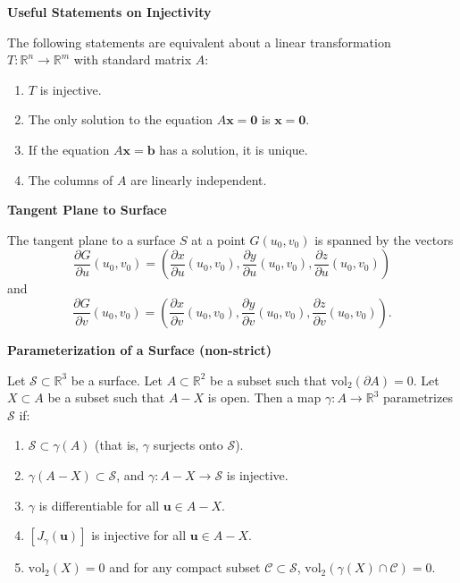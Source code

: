 \documentclass{article}
\newenvironment{definition}[1]{
    \par\noindent\textbf{#1}\par\noindent
}{
    \par \vspace{0.5cm}
}
\begin{document}
\begin{definition}{Useful Statements on Injectivity}
The following statements are equivalent about a linear transformation \(T : \mathbb{R}^n \to \mathbb{R}^m\) with standard matrix \(A\):
\begin{enumerate}
    \item \(T\) is injective.
    \item The only solution to the equation \(A\bm{x} = \bm{0}\) is \(\bm{x} = \bm{0}\).
    \item If the equation \(A\bm{x} = \bm{b}\) has a solution, it is unique.
    \item The columns of \(A\) are linearly independent.
\end{enumerate}
\end{definition}

\begin{definition}{Tangent Plane to Surface}
The tangent plane to a surface \(S\) at a point \(G(u_0, v_0)\) is spanned by the vectors
\[
\frac{\partial G}{\partial u}(u_0, v_0) = \left( \frac{\partial x}{\partial u}(u_0, v_0), \frac{\partial y}{\partial u}(u_0, v_0), \frac{\partial z}{\partial u}(u_0, v_0) \right)
\]
and
\[
\frac{\partial G}{\partial v}(u_0, v_0) = \left( \frac{\partial x}{\partial v}(u_0, v_0), \frac{\partial y}{\partial v}(u_0, v_0), \frac{\partial z}{\partial v}(u_0, v_0) \right).
\]
\end{definition}

\begin{definition}{Parameterization of a Surface (non-strict)}
Let \(\mathcal{S} \subset \mathbb{R}^3\) be a surface. Let \(A \subset \mathbb{R}^2\) be a subset such that \(\text{vol}_2(\partial A) = 0\). Let \(X \subset A\) be a subset such that \(A - X\) is open. Then a map \(\gamma : A \to \mathbb{R}^3\) parametrizes \(\mathcal{S}\) if:
\begin{enumerate}
    \item \(\mathcal{S} \subset \gamma(A)\) (that is, \(\gamma\) surjects onto \(\mathcal{S}\)).
    \item \(\gamma(A - X) \subset \mathcal{S}\), and \(\gamma : A - X \to \mathcal{S}\) is injective.
    \item \(\gamma\) is differentiable for all \(\bm{u} \in A - X\).
    \item \([J_{\gamma}(\bm{u})]\) is injective for all \(\bm{u} \in A - X\).
    \item \(\text{vol}_2(X) = 0\) and for any compact subset \(\mathcal{C} \subset \mathcal{S}\), \(\text{vol}_2(\gamma(X) \cap \mathcal{C}) = 0\).
\end{enumerate}
\end{definition}
\end{document}
